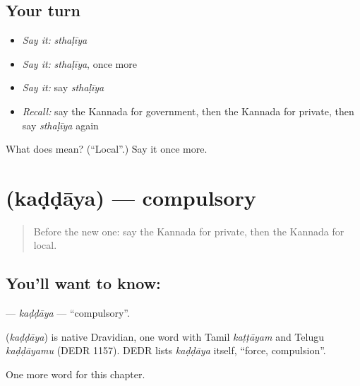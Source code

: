 \subsection*{Your turn}
\begin{itemize}
\raggedright
  \item \emph{Say it:} \emph{sthaḷīya}
  \item \emph{Say it:} \emph{sthaḷīya}, once more
  \item \emph{Say it:} say \emph{sthaḷīya}
  \item \emph{Recall:} say the Kannada for government, then the Kannada for private, then say \emph{sthaḷīya} again
\end{itemize}

\begin{tcolorbox}[breakable,colback=teal!4,colframe=teal!35!black,title={Before you move on}]
What does  mean? (\textquotedblleft{}Local\textquotedblright{}.) Say it once more.
\end{tcolorbox}
\section[\texorpdfstring{\kn{ಕಡ್ಡಾಯ} (kaḍḍāya)}{ಕಡ್ಡಾಯ (kaḍḍāya)}]{ (kaḍḍāya) — compulsory}

\label{lesson:KA-C180-kaddaya}



\begin{quote}
Before the new one: say the Kannada for private, then the Kannada for local.
\end{quote}

\subsection*{You'll want to know: }
\textbf{} — \emph{kaḍḍāya} — \textquotedblleft{}compulsory\textquotedblright{}.

\begin{cousinweb}
\textbf{} (\emph{kaḍḍāya}) is native Dravidian, one word with Tamil \emph{kaṭṭāyam} and Telugu \emph{kaḍḍāyamu} (DEDR 1157). DEDR lists \emph{kaḍḍāya} itself, \textquotedblleft{}force, compulsion\textquotedblright{}.
\end{cousinweb}

\begin{grammarlens}[title={What you've built}]
One more word for this chapter.
\end{grammarlens}

